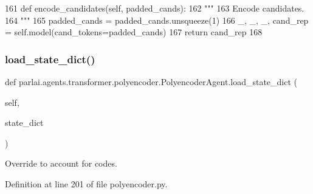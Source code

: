 \begin{DoxyCode}
161     \textcolor{keyword}{def }encode\_candidates(self, padded\_cands):
162         \textcolor{stringliteral}{"""}
163 \textcolor{stringliteral}{        Encode candidates.}
164 \textcolor{stringliteral}{        """}
165         padded\_cands = padded\_cands.unsqueeze(1)
166         \_, \_, \_, cand\_rep = self.model(cand\_tokens=padded\_cands)
167         \textcolor{keywordflow}{return} cand\_rep
168 
\end{DoxyCode}
\mbox{\label{classparlai_1_1agents_1_1transformer_1_1polyencoder_1_1PolyencoderAgent_a4b6301664c0a7e98e9c688cc75ca79dc}} 
\subsubsection{\texorpdfstring{load\+\_\+state\+\_\+dict()}{load\_state\_dict()}}
{\footnotesize\ttfamily def parlai.\+agents.\+transformer.\+polyencoder.\+Polyencoder\+Agent.\+load\+\_\+state\+\_\+dict (\begin{DoxyParamCaption}\item[{}]{self,  }\item[{}]{state\+\_\+dict }\end{DoxyParamCaption})}

\begin{DoxyVerb}Override to account for codes.
\end{DoxyVerb}
 

Definition at line 201 of file polyencoder.\+py.


